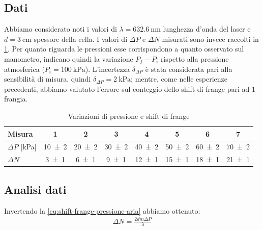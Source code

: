 \documentclass[a4paper]{article}
\begin{document}
\subsection{Dati}
Abbiamo considerato noti i valori di $\lambda=\SI{632.6}{\nano\meter}$ lunghezza d'onda del laser e $d=\SI{3}{\centi\meter}$ spessore della cella. I valori di $\Delta P$ e $\Delta N$ misurati sono invece raccolti in \cref{tab:delta-p-e-delta-n}. Per quanto riguarda le pressioni esse corrispondono a quanto osservato sul manometro, indicano quindi la variazione $P_f- P_i$ rispetto alla pressione atmosferica ($P_i = \SI{100}{\kilo\pascal}$). L'incertezza $\delta_{\Delta P}$ è stata considerata pari alla sensibilità di misura, quindi $\delta_{\Delta P}=\SI{2}{\kilo\pascal}$; mentre, come nelle esperienze precedenti, abbiamo valutato l'errore sul conteggio dello shift di frange pari ad 1 frangia.

\begin{table}[htbp]
\centering
\caption{Variazioni di pressione e shift di frange}
\label{tab:delta-p-e-delta-n}
\begin{tabular}{|l|ccccccc|}
\hline
Misura & 1 & 2 & 3 & 4 & 5 & 6 & 7 \\\hline\hline
$\Delta P$ [\si{\kilo\pascal}] & \num{10 \pm 2} & \num{20 \pm 2} & \num{30 \pm 2} & \num{40 \pm 2} & \num{50 \pm 2} & \num{60 \pm 2} & \num{70 \pm 2} \\\hline
$\Delta N$ & \num{3 \pm 1} & \num{6 \pm 1} & \num{9 \pm 1} & \num{12 \pm 1} & \num{15 \pm 1} & \num{18 \pm 1} & \num{21 \pm 1} \\\hline
\end{tabular}
\end{table}

\subsection{Analisi dati}
Invertendo la \cref{eq:shift-frange-pressione-aria} abbiamo ottenuto:
\begin{align}
    \Delta N = \frac{2dm \Delta P}{\lambda}
\end{align}
\end{document}
